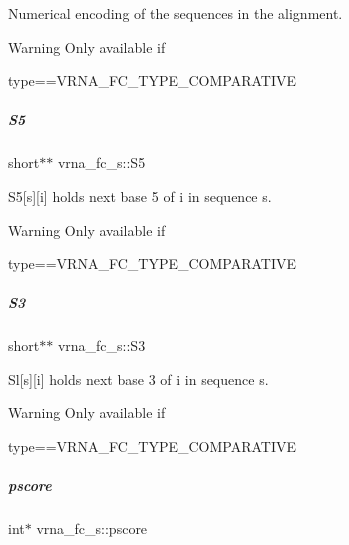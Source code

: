 Numerical encoding of the sequences in the alignment. 

\begin{DoxyWarning}{Warning}
Only available if\begin{DoxyVerb}type==VRNA_FC_TYPE_COMPARATIVE \end{DoxyVerb}
 
\end{DoxyWarning}
\mbox{\label{group__fold__compound_a78d089b475e2230bd536b9a6ed8bb17c}} 
\subparagraph{\texorpdfstring{S5}{S5}}
{\footnotesize\ttfamily short$\ast$$\ast$ vrna\+\_\+fc\+\_\+s\+::\+S5}



S5\mbox{[}s\mbox{]}\mbox{[}i\mbox{]} holds next base 5\textquotesingle{} of i in sequence s. 

\begin{DoxyWarning}{Warning}
Only available if\begin{DoxyVerb}type==VRNA_FC_TYPE_COMPARATIVE \end{DoxyVerb}
 
\end{DoxyWarning}
\mbox{\label{group__fold__compound_af6ab2a25b84d2308ee23f6b11b5fd52d}} 
\subparagraph{\texorpdfstring{S3}{S3}}
{\footnotesize\ttfamily short$\ast$$\ast$ vrna\+\_\+fc\+\_\+s\+::\+S3}



Sl\mbox{[}s\mbox{]}\mbox{[}i\mbox{]} holds next base 3\textquotesingle{} of i in sequence s. 

\begin{DoxyWarning}{Warning}
Only available if\begin{DoxyVerb}type==VRNA_FC_TYPE_COMPARATIVE \end{DoxyVerb}
 
\end{DoxyWarning}
\mbox{\label{group__fold__compound_a14dc7755af6019ddbd0cf94b209e89dd}} 
\subparagraph{\texorpdfstring{pscore}{pscore}}
{\footnotesize\ttfamily int$\ast$ vrna\+\_\+fc\+\_\+s\+::pscore}



